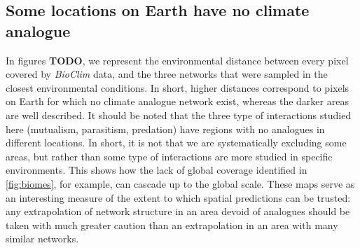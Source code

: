 \hypertarget{some-locations-on-earth-have-no-climate-analogue}{%
\subsection{Some locations on Earth have no climate
analogue}\label{some-locations-on-earth-have-no-climate-analogue}}

In figures \textbf{TODO}, we represent the environmental distance
between every pixel covered by \emph{BioClim} data, and the three
networks that were sampled in the closest environmental conditions. In
short, higher distances correspond to pixels on Earth for which no
climate analogue network exist, whereas the darker areas are well
described. It should be noted that the three type of interactions
studied here (mutualism, parasitism, predation) have regions with no
analogues in different locations. In short, it is not that we are
systematically excluding some areas, but rather than some type of
interactions are more studied in specific environments. This shows how
the lack of global coverage identified in \cref{fig:biomes}, for
example, can cascade up to the global scale. These maps serve as an
interesting measure of the extent to which spatial predictions can be
trusted: any extrapolation of network structure in an area devoid of
analogues should be taken with much greater caution than an
extrapolation in an area with many similar networks.

